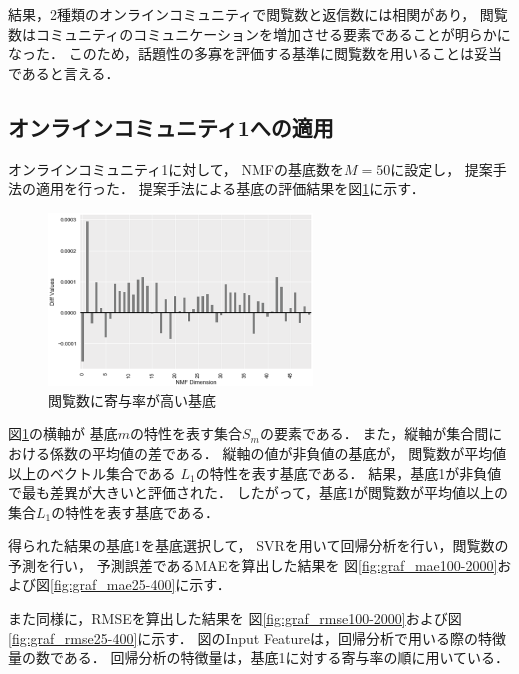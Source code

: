 \documentclass[12pt,a4paper,twocolumn,twoside]{jsik}
\begin{document}
結果，2種類のオンラインコミュニティで閲覧数と返信数には相関があり，
閲覧数はコミュニティのコミュニケーションを増加させる要素であることが明らかになった．
%
このため，話題性の多寡を評価する基準に閲覧数を用いることは妥当であると言える．

\subsection{オンラインコミュニティ1への適用}\label{result_1}
オンラインコミュニティ1に対して，
NMFの基底数を$M=50$に設定し，
提案手法の適用を行った．
%
提案手法による基底の評価結果を図\ref{fig:graf_factor_result1}に示す．
%
\begin{figure}[htb]
  \begin{center}
    \includegraphics[width=7cm]{./eps/u_histgram_diff.eps}
    \caption{閲覧数に寄与率が高い基底}
    \label{fig:graf_factor_result1}
  \end{center}
\end{figure}

図\ref{fig:graf_factor_result1}の横軸が
基底$m$の特性を表す集合$S_{m}$の要素である．
また，縦軸が集合間における係数の平均値の差である．
%
縦軸の値が非負値の基底が，
閲覧数が平均値以上のベクトル集合である
$L_{1}$の特性を表す基底である．
%
結果，基底1が非負値で最も差異が大きいと評価された．
したがって，基底1が閲覧数が平均値以上の
集合$L_{1}$の特性を表す基底である．

得られた結果の基底1を基底選択して，
SVRを用いて回帰分析を行い，閲覧数の予測を行い，
予測誤差であるMAEを算出した結果を
図\ref{fig:graf_mae100-2000}および図\ref{fig:graf_mae25-400}に示す．

また同様に，RMSEを算出した結果を
図\ref{fig:graf_rmse100-2000}および図\ref{fig:graf_rmse25-400}に示す．
%
図のInput Featureは，回帰分析で用いる際の特徴量の数である．
回帰分析の特徴量は，基底1に対する寄与率の順に用いている．
\end{document}
